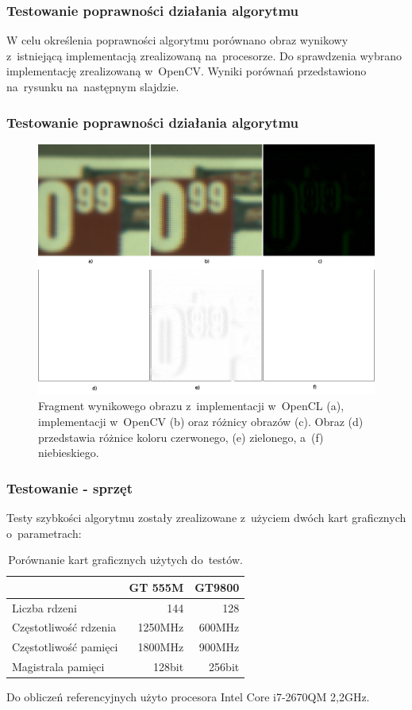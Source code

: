\documentclass{beamer}
\begin{document}
\begin{frame}
  \frametitle{Testowanie poprawności działania algorytmu}

W celu określenia poprawności algorytmu porównano obraz wynikowy z~istniejącą implementacją zrealizowaną na~procesorze. Do sprawdzenia wybrano implementację zrealizowaną w~OpenCV. Wyniki porównań przedstawiono na~rysunku na~następnym slajdzie.

\end{frame}

\begin{frame}
  \frametitle{Testowanie poprawności działania algorytmu}
\begin{figure}
  \centering
  \includegraphics[width=0.55\linewidth]{result_diff}
  \caption{Fragment wynikowego obrazu z~implementacji w~OpenCL (a), implementacji w~OpenCV (b) oraz różnicy obrazów (c). Obraz (d) przedstawia różnice koloru czerwonego, (e) zielonego, a~(f) niebieskiego.}
  \label{fig:result_diff}
\end{figure}
\end{frame}

\begin{frame}
  \frametitle{Testowanie - sprzęt}
  Testy szybkości algorytmu zostały zrealizowane z~użyciem dwóch kart graficznych o~parametrach:
\begin{center}
\begin{table}
  \caption{Porównanie kart graficznych użytych do~testów.}
  \label{tab:gpus}
     \begin{tabular}{ |l | r | r | }
     \hline
       & GT 555M & GT9800 \\ \hline
     Liczba rdzeni & 144 & 128 \\ \hline
     Częstotliwość rdzenia & 1250MHz & 600MHz \\ \hline
     Częstotliwość pamięci & 1800MHz & 900MHz \\ \hline
     Magistrala pamięci & 128bit & 256bit \\ \hline

   \end{tabular}

\end{table}
\end{center}
Do obliczeń referencyjnych użyto procesora Intel Core i7-2670QM 2,2GHz.
\end{frame}
\end{document}
